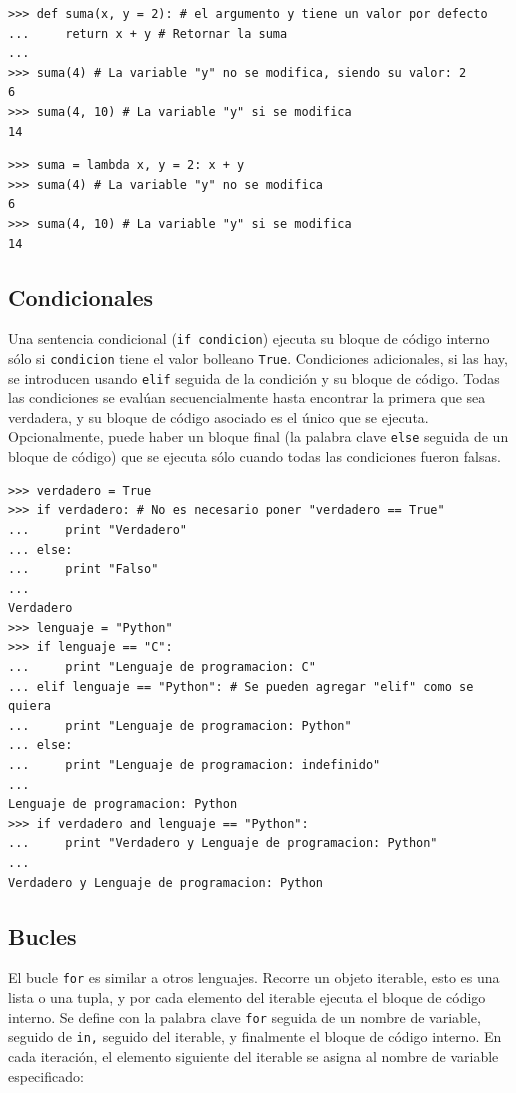 \begin{lstlisting}
>>> def suma(x, y = 2): # el argumento y tiene un valor por defecto
...     return x + y # Retornar la suma
...
>>> suma(4) # La variable "y" no se modifica, siendo su valor: 2
6
>>> suma(4, 10) # La variable "y" si se modifica
14
\end{lstlisting}


\begin{lstlisting}
>>> suma = lambda x, y = 2: x + y
>>> suma(4) # La variable "y" no se modifica
6
>>> suma(4, 10) # La variable "y" si se modifica
14
\end{lstlisting}

\subsection{Condicionales}
 Una sentencia condicional (\verb~if condicion~) ejecuta su bloque de código interno sólo si \verb~condicion~ tiene el valor bolleano \verb~True~.  Condiciones adicionales, si las hay, se introducen usando \verb~elif~ seguida de la condición y su bloque de código. Todas las condiciones se evalúan secuencialmente hasta encontrar la primera que sea verdadera, y su bloque de código asociado es el único que se ejecuta. Opcionalmente, puede haber un bloque final (la palabra clave \verb~else~ seguida de un bloque de código) que se ejecuta sólo cuando todas las condiciones fueron falsas.



\begin{lstlisting}
>>> verdadero = True
>>> if verdadero: # No es necesario poner "verdadero == True"
...     print "Verdadero"
... else:
...     print "Falso"
...
Verdadero
>>> lenguaje = "Python"
>>> if lenguaje == "C": 
...     print "Lenguaje de programacion: C"
... elif lenguaje == "Python": # Se pueden agregar "elif" como se quiera
...     print "Lenguaje de programacion: Python"
... else: 
...     print "Lenguaje de programacion: indefinido"
...
Lenguaje de programacion: Python
>>> if verdadero and lenguaje == "Python": 
...     print "Verdadero y Lenguaje de programacion: Python"
...
Verdadero y Lenguaje de programacion: Python
\end{lstlisting}






\subsection{Bucles}
El bucle \verb~for~ es similar a  otros lenguajes. Recorre un objeto iterable, esto es  una lista o una tupla, y por cada elemento del iterable ejecuta el bloque de código interno. Se define con la palabra clave \verb~for~ seguida de un nombre de variable, seguido de \verb~in,~ seguido del iterable, y finalmente el bloque de código interno. En cada iteración, el elemento siguiente del iterable se asigna al nombre de variable especificado:

